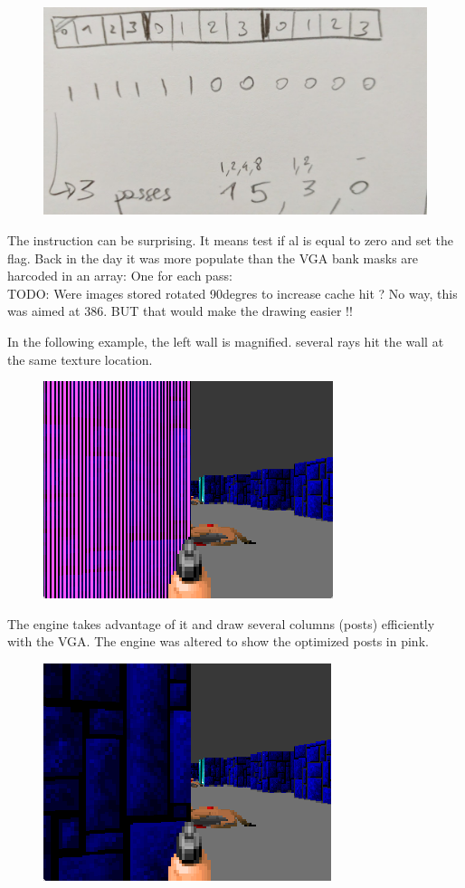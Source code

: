 \documentclass[book.tex]{subfiles}
\begin{document}
 \begin{figure}[H]
 \centering
 \includegraphics[scale=0.3]{imgs/scalePost_explanation2.png}
 \end{figure}
The instruction  can be surprising. It means test if al is equal to zero and set the flag. Back in the day it was more populate than 
 the VGA bank masks are harcoded in an array: One for each pass:\\

TODO: Were images stored rotated 90degres to increase cache hit ? No way, this was aimed at 386. BUT that would make the drawing easier !!

In the following example, the left wall is magnified. several rays hit the wall at the same texture location.
\begin{figure}[H]
 \centering
 \includegraphics[scale=1.3]{imgs/post_optimization_1_pink_show.png}
\end{figure}
The engine takes advantage of it and draw several columns (posts) efficiently with the VGA. The engine was altered to show the optimized posts in pink.
\begin{figure}[H]
 \centering
 \includegraphics[scale=1.3]{imgs/post_optimization_1_show.png}
\end{figure}
\end{document}
